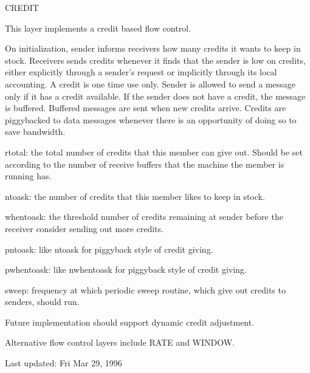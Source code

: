 \begin{Layer}{CREDIT}

This layer implements a credit based flow control.

\begin{Protocol}
On initialization, sender informs receivers how many credits it wants to
keep in stock.  Receivers sends credits whenever it finds that the sender
is low on credits, either explicitly through a sender's request or
implicitly through its local accounting.  A credit is one time use only.
Sender is allowed to send a message only if it has a credit available.  If
the sender does not have a credit, the message is buffered.  Buffered
messages are sent when new credits arrive.  Credits are piggybacked to data
messages whenever there is an opportunity of doing so to save bandwidth.
\end{Protocol}

\begin{Parameters}
\item 
rtotal: the total number of credits that this member can give out.  Should
be set according to the number of receive buffers that the machine the
member is running has.
\item 
ntoask: the number of credits that this member likes to keep in stock.
\item 
whentoask: the threshold number of credits remaining at sender before the
receiver consider sending out more credits.
\item 
pntoask: like ntoask for piggyback style of credit giving.
\item 
pwhentoask: like nwhentoask for piggyback style of credit giving.
\item 
sweep: frequency at which periodic sweep routine, which give out credits to
senders, should run.
\end{Parameters}


\begin{Notes}
\item Future implementation should support dynamic credit adjustment.
\item Alternative flow control layers include RATE and WINDOW.
\end{Notes}

\begin{Sources}
\end{Sources}

Last updated: Fri Mar 29, 1996

\end{Layer}

